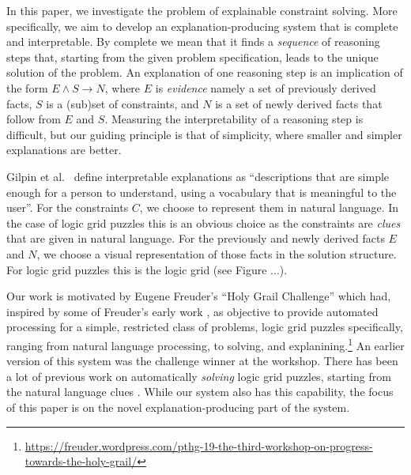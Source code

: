 In this paper, we investigate the problem of explainable constraint solving. More specifically, we aim to develop an explanation-producing system that is complete and interpretable. By complete we mean that it finds a \textit{sequence} of reasoning steps that, starting from the given problem specification, leads to the unique solution of the problem. An explanation of one reasoning step is an implication of the form $E \wedge S \rightarrow N$, where $E$ is \textit{evidence} namely a set of previously derived facts, $S$ is a (sub)set of constraints, and $N$ is a set of newly derived facts that follow from $E$ and $S$. Measuring the interpretability of a reasoning step is difficult, but our guiding principle is that of simplicity, where smaller and simpler explanations are better. 


Gilpin et al.~\cite{DBLP:conf/dsaa/GilpinBYBSK18} define interpretable explanations as ``descriptions that are simple enough for a person to understand, using a vocabulary that is meaningful to the user''. For the constraints $C$, we choose to represent them in natural language. In the case of logic grid puzzles this is an obvious choice as the constraints are \textit{clues} that are given in natural language. For the previously and newly derived facts $E$ and $N$, we choose a visual representation of those facts in the solution structure. For logic grid puzzles this is the logic grid (see Figure ...).

Our work is motivated by Eugene Freuder's ``Holy Grail Challenge'' which had, inspired by some of Freuder's early work \cite{DBLP:conf/aaai/SabinF96,DBLP:conf/aaai/SqalliF96}, as objective  to provide automated processing for a simple, restricted class of problems, logic grid puzzles specifically, ranging from natural language processing, to solving, and explanining.\footnote{\url{https://freuder.wordpress.com/pthg-19-the-third-workshop-on-progress-towards-the-holy-grail/}} 
An earlier version of this system was the challenge winner at the workshop. 
There has been a lot of previous work on automatically \emph{solving} logic grid puzzles, starting from the natural language clues \cite{related,work}. 
While our system also has this capability, the focus of this paper is on the novel explanation-producing part of the system.

